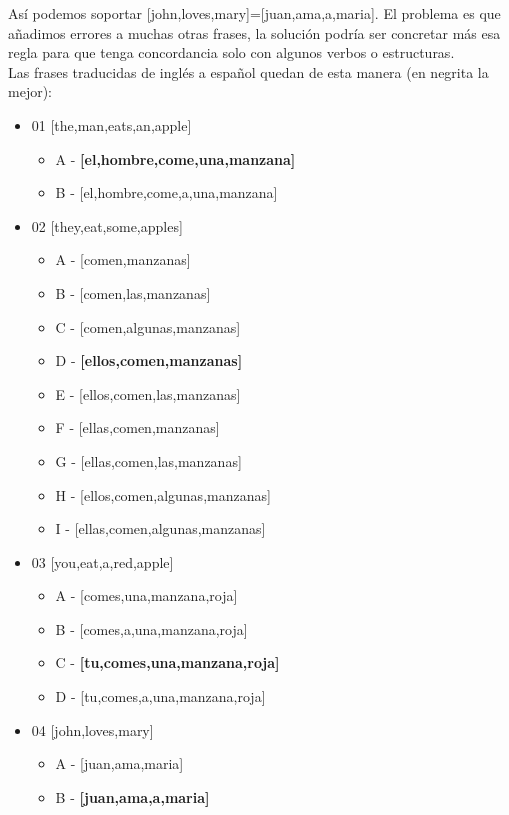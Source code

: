 \documentclass{article}
\begin{document}
Así podemos soportar [john,loves,mary]=[juan,ama,a,maria]. El problema es que añadimos errores 
a muchas otras frases, la solución podría ser concretar más esa regla para que tenga concordancia solo con algunos verbos 
o estructuras. \\

Las frases traducidas de inglés a español quedan de esta manera (en negrita la mejor):

\begin{itemize}
    \item 01 [the,man,eats,an,apple]
    \begin{itemize}
        \item A - \textbf{[el,hombre,come,una,manzana]}
        \item B - [el,hombre,come,a,una,manzana]
    \end{itemize}

    \item 02 [they,eat,some,apples]
    \begin{itemize}
        \item A - [comen,manzanas]
        \item B - [comen,las,manzanas]
        \item C - [comen,algunas,manzanas]
        \item D - \textbf{[ellos,comen,manzanas]}
        \item E - [ellos,comen,las,manzanas]
        \item F - [ellas,comen,manzanas]
        \item G - [ellas,comen,las,manzanas]
        \item H - [ellos,comen,algunas,manzanas]
        \item I - [ellas,comen,algunas,manzanas]
    \end{itemize}

    \item 03 [you,eat,a,red,apple]
    \begin{itemize}
        \item A - [comes,una,manzana,roja]
        \item B - [comes,a,una,manzana,roja]
        \item C - \textbf{[tu,comes,una,manzana,roja]}
        \item D - [tu,comes,a,una,manzana,roja]
    \end{itemize}

    \item 04 [john,loves,mary]
    \begin{itemize}
        \item A - [juan,ama,maria]
        \item B - \textbf{[juan,ama,a,maria]}
    \end{itemize}


\end{itemize}
\end{document}
